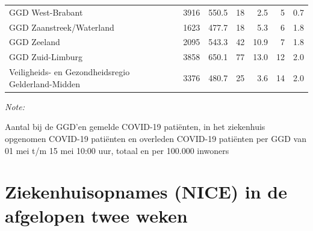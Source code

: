 \documentclass[
  english,
  man,floatsintext]{apa6}
\begin{document}
\begin{table}
\begin{threeparttable}
\begin{tabular}{lrrrrrr}
GGD West-Brabant & 3916 & 550.5 & 18 & 2.5 & 5 & 0.7\\
GGD Zaanstreek/Waterland & 1623 & 477.7 & 18 & 5.3 & 6 & 1.8\\
GGD Zeeland & 2095 & 543.3 & 42 & 10.9 & 7 & 1.8\\
GGD Zuid-Limburg & 3858 & 650.1 & 77 & 13.0 & 12 & 2.0\\
Veiligheids- en Gezondheidsregio Gelderland-Midden & 3376 & 480.7 & 25 & 3.6 & 14 & 2.0\\
\bottomrule
\end{tabular}
\begin{tablenotes}
\item \textit{Note: } 
\item Aantal bij de GGD’en gemelde COVID-19 patiënten, in het ziekenhuis opgenomen COVID-19 patiënten en overleden COVID-19 patiënten per GGD van 01 mei t/m 15 mei 10:00 uur, totaal en per 100.000 inwoners
\end{tablenotes}
\end{threeparttable}
\endgroup{}
\end{table}

\newpage

\hypertarget{ziekenhuisopnames-nice-in-de-afgelopen-twee-weken}{%
\section{Ziekenhuisopnames (NICE) in de afgelopen twee weken}\label{ziekenhuisopnames-nice-in-de-afgelopen-twee-weken}}
\end{document}
